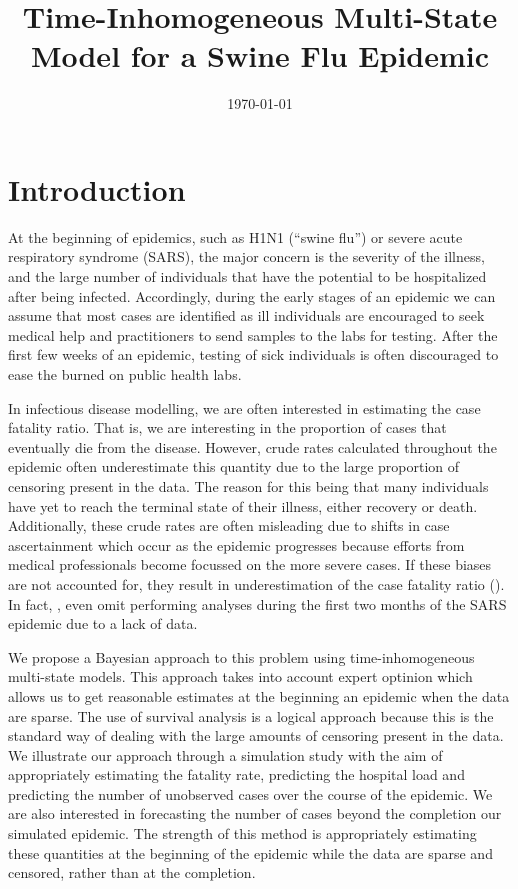 \documentclass[12pt]{article}
\title{\textbf{Time-Inhomogeneous Multi-State Model for a Swine Flu Epidemic}}
\date{\today}
\begin{document}
\maketitle


\section{Introduction}
\label{sec:introduction}

At the beginning of epidemics, such as H1N1 (``swine flu'') or severe acute respiratory syndrome (SARS), the major concern is the severity of the illness,
and the large number of individuals that have the potential to be hospitalized after being infected.  
Accordingly, during the early stages of an epidemic
we can assume that most cases are identified as ill individuals are encouraged to seek medical help and practitioners
to send samples to the labs for testing.  After the first few
weeks of an epidemic, testing of sick individuals is often discouraged to ease the burned on public health labs. 

In infectious disease modelling, we are often interested in estimating the case fatality ratio.  
That is, we are interesting in the proportion of cases
that eventually die from the disease.  However, crude rates calculated
throughout the epidemic often underestimate this quantity due to the large proportion of censoring present in the data.  The reason for this being that many 
individuals have yet to reach the terminal state of their illness, either recovery or death.
Additionally, these crude rates are often misleading due to shifts in case ascertainment which occur as the epidemic progresses because 
efforts from medical professionals become focussed on the more severe cases.  If these biases are not accounted for, they result in underestimation 
of the case fatality ratio (\cite{garske-bmj-2009}).  In fact, \cite{ghani-AmericanJournalEpi-2005}, even omit performing analyses during the first two months 
of the SARS epidemic due to a lack of data. 

We propose a Bayesian approach to this problem using time-inhomogeneous multi-state models.  This approach takes into account expert optinion which allows us to 
get reasonable estimates at the beginning an epidemic when the data are sparse.  The use of survival analysis is
a logical approach because this is the standard way of dealing with the large amounts of censoring present in the data.  We illustrate our approach through a simulation study
with the aim of appropriately estimating the fatality rate, predicting the hospital load and predicting the number of unobserved cases over the course
of the epidemic.  We are also interested in forecasting the number of
cases beyond the completion our simulated epidemic.  The strength of this method is appropriately estimating these quantities at the 
beginning of the epidemic while the data are sparse and censored, rather than at the completion.
\end{document}
